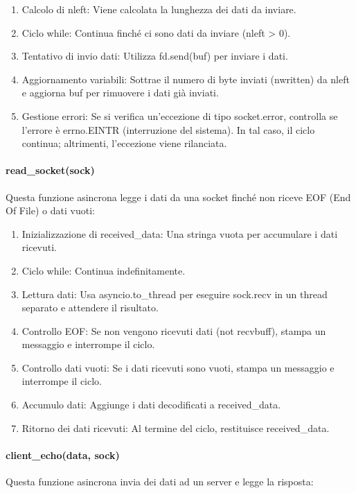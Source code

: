 \documentclass{article}
\begin{document}
\begin{enumerate}
\item Calcolo di nleft: Viene calcolata la lunghezza dei dati da inviare.
\item Ciclo while: Continua finché ci sono dati da inviare (nleft > 0).
\item Tentativo di invio dati: Utilizza fd.send(buf) per inviare i dati.
\item Aggiornamento variabili: Sottrae il numero di byte inviati (nwritten) da nleft e aggiorna buf per rimuovere i dati già inviati.
\item Gestione errori: Se si verifica un'eccezione di tipo socket.error, controlla se l'errore è errno.EINTR (interruzione del sistema). In tal caso, il ciclo continua; altrimenti, l'eccezione viene rilanciata.
\end{enumerate}



\paragraph{read\_socket(sock)}
Questa funzione asincrona legge i dati da una socket finché non riceve EOF (End Of File) o dati vuoti:

\begin{enumerate}
\item Inizializzazione di received\_data: Una stringa vuota per accumulare i dati ricevuti.
\item Ciclo while: Continua indefinitamente.
\item Lettura dati: Usa asyncio.to\_thread per eseguire sock.recv in un thread separato e attendere il risultato.
\item Controllo EOF: Se non vengono ricevuti dati (not recvbuff), stampa un messaggio e interrompe il ciclo.
\item Controllo dati vuoti: Se i dati ricevuti sono vuoti, stampa un messaggio e interrompe il ciclo.
\item Accumulo dati: Aggiunge i dati decodificati a received\_data.
\item Ritorno dei dati ricevuti: Al termine del ciclo, restituisce received\_data.
\end{enumerate}

\paragraph{client\_echo(data, sock)}
Questa funzione asincrona invia dei dati ad un server e legge la risposta:
\end{document}
